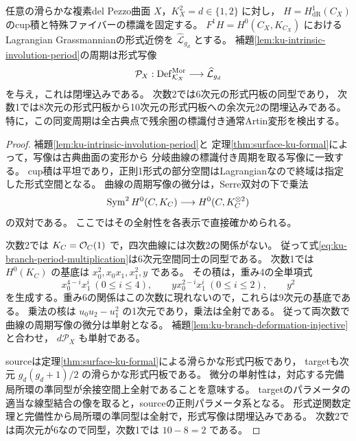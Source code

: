 \begin{theorem}[内在的同変周期の形式的局所Torelli]
\label{thm:ku-intrinsic-formal-torelli}
任意の滑らかな複素del Pezzo曲面 $X$，$K_X^2=d\in\{1,2\}$ に対し，
$H=H^1_{\mathrm{dR}}(C_X)$ のcup積と特殊ファイバーの標識を固定する。
$F^1H=H^0(C_X,K_{C_X})$ におけるLagrangian Grassmannianの形式近傍を
$\widehat{\mathcal L}_{g_d}$ とする。
補題\ref{lem:ku-intrinsic-involution-period}の周期は形式写像
\begin{equation}\label{eq:ku-intrinsic-formal-period}
 \mathcal P_X:
 \operatorname{Def}^{\mathrm{Mor}}_{\mathcal K_X}
 \longrightarrow\widehat{\mathcal L}_{g_d}
\end{equation}
を与え，これは閉埋込みである。
次数2では6次元の形式円板の同型であり，
次数1では8次元の形式円板から10次元の形式円板への余次元2の閉埋込みである。
特に，この同変周期は全古典点で残余圏の標識付き通常Artin変形を検出する。
\end{theorem}
\begin{proof}
補題\ref{lem:ku-intrinsic-involution-period}と
定理\ref{thm:surface-ku-formal}によって，写像は古典曲面の変形から
分岐曲線の標識付き周期を取る写像に一致する。
cup積は平坦であり，正則1形式の部分空間はLagrangianなので終域は指定した形式空間となる。
曲線の周期写像の微分は，Serre双対の下で乗法
\begin{equation}\label{eq:ku-branch-period-multiplication}
 \operatorname{Sym}^2H^0(C,K_C)\longrightarrow H^0(C,K_C^{\otimes2})
\end{equation}
の双対である\cite[Theorem~4.3]{Landesman2019Torelli}。
ここではその全射性を各表示で直接確かめられる。

次数2では $K_C=\mathcal O_C(1)$ で，四次曲線には次数2の関係がない。
従って式\eqref{eq:ku-branch-period-multiplication}は6次元空間同士の同型である。
次数1では $H^0(K_C)$ の基底は $x_0^2,x_0x_1,x_1^2,y$ である。
その積は，重み4の全単項式
\[
 x_0^{4-i}x_1^i\ (0\le i\le4),\qquad
 yx_0^{2-i}x_1^i\ (0\le i\le2),\qquad y^2
\]
を生成する。重み6の関係はこの次数に現れないので，これらは9次元の基底である。
乗法の核は $u_0u_2-u_1^2$ の1次元であり，乗法は全射である。
従って両次数で曲線の周期写像の微分は単射となる。
補題\ref{lem:ku-branch-deformation-injective}と合わせ，
$d\mathcal P_X$ も単射である。

sourceは定理\ref{thm:surface-ku-formal}による滑らかな形式円板であり，
targetも次元 $g_d(g_d+1)/2$ の滑らかな形式円板である。
微分の単射性は，対応する完備局所環の準同型が余接空間上全射であることを意味する。
targetのパラメータの適当な線型結合の像を取ると，sourceの正則パラメータ系となる。
形式逆関数定理と完備性から局所環の準同型は全射で，形式写像は閉埋込みである。
次数2では両次元が6なので同型，次数1では $10-8=2$ である。
\end{proof}

